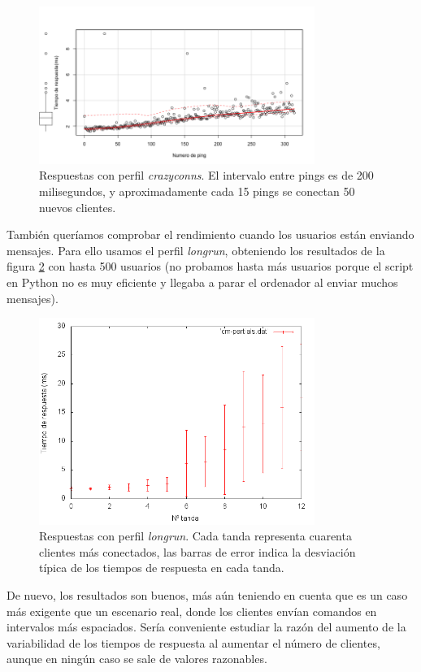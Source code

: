 \documentclass{article}
\begin{document}
\begin{figure}[hbtp]
\centering
\includegraphics[width=0.8\textwidth]{scatter.png}
\caption{Respuestas con perfil \textit{crazyconns}. El intervalo entre pings es de 200 milisegundos, y aproximadamente cada 15 pings se conectan 50 nuevos clientes.}
\label{imgCrazyconns}
\end{figure}

También queríamos comprobar el rendimiento cuando los usuarios están enviando mensajes. Para ello usamos el perfil \textit{longrun}, obteniendo los resultados de la figura \ref{imgLongrun} con hasta 500 usuarios (no probamos hasta más usuarios porque el script en Python no es muy eficiente y llegaba a parar el ordenador al enviar muchos mensajes).

\begin{figure}[hbtp]
\centering
\includegraphics[width=0.8\textwidth]{longrun.png}
\caption{Respuestas con perfil \textit{longrun}. Cada tanda representa cuarenta clientes más conectados, las barras de error indica la desviación típica de los tiempos de respuesta en cada tanda.}
\label{imgLongrun}
\end{figure}

De nuevo, los resultados son buenos, más aún teniendo en cuenta que es un caso más exigente que un escenario real, donde los clientes envían comandos en intervalos más espaciados. Sería conveniente estudiar la razón del aumento de la variabilidad de los tiempos de respuesta al aumentar el número de clientes, aunque en ningún caso se sale de valores razonables.
\end{document}
